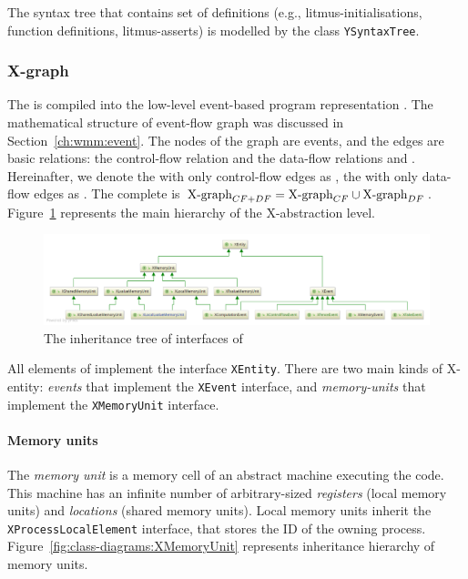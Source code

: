 The syntax tree that contains set of definitions (e.g., litmus-initialisations, function definitions, litmus-asserts) is modelled by the class \texttt{YSyntaxTree}.


\subsubsection{X-graph}
\label{ch:impl:model:xgraph}

The \ytree{} is compiled into the low-level event-based program representation \textit{\xgraph{}}.
The mathematical structure of event-flow graph was discussed in Section~\ref{ch:wmm:event}.
The nodes of the graph are events, and the edges are basic relations: the control-flow relation \po and the data-flow relations \co and \rf.
Hereinafter, we denote the \xgraph{} with only control-flow edges as \xgraph[CF], the \xgraph{} with only data-flow edges as \xgraph[CF]. The complete \xgraph{} is $\xgraph[CF+DF] = \xgraph[CF] \cup \xgraph[DF]$.
Figure~\ref{fig:class-diagrams:XEntity-interfaces} represents the main hierarchy of the X-abstraction level.

\begin{figure}[t]%
  \centering
  \includegraphics[width=\textwidth,keepaspectratio]{img/my/class-diagrams/XEntity-interfaces.png}
  \caption{The inheritance tree of interfaces of \xgraph{}}
  \label{fig:class-diagrams:XEntity-interfaces}
\end{figure}

All elements of \xgraph{} implement the interface \texttt{XEntity}.
There are two main kinds of X-entity: \textit{events} that implement the \texttt{XEvent} interface, and \textit{memory-units} that implement the \texttt{XMemoryUnit} interface.


\paragraph{Memory units}
\label{ch:impl:model:xgraph:mem}

The \textit{memory unit} is a memory cell of an abstract machine executing the code.
This machine has an infinite number of arbitrary-sized \textit{registers} (local memory units) and \textit{locations} (shared memory units).
Local memory units inherit the \texttt{XProcessLocalElement} interface, that stores the ID of the owning process.
Figure~\ref{fig:class-diagrams:XMemoryUnit} represents inheritance hierarchy of memory units.

